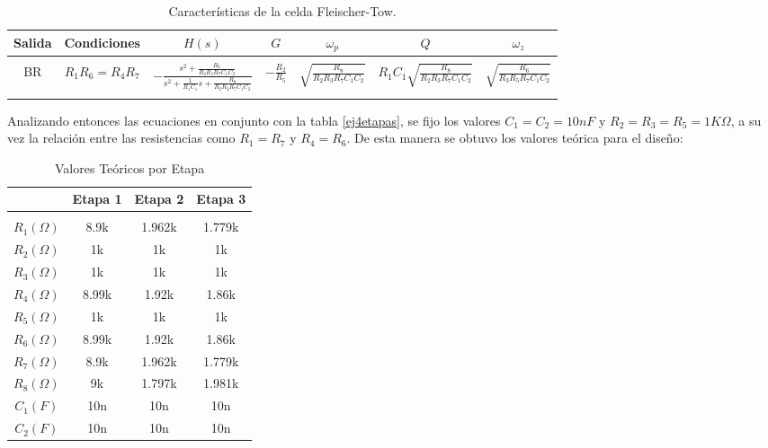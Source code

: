 \begin{table}[H] %
	\centering
	\begin{tabular}{c c c c c c c}
		Salida & Condiciones & $H(s)$ & $G$ & $\omega_p$ & $Q$ & $\omega_z$\\
		\hline \\
		BR &$R_1R_6=R_4R_7$ &\multirow{2}{*}{$- \frac{s^2+\frac{R_6}{R_3R_5R_7C_1C_2}}{s^2+\frac{1}{R_1C_1}s+\frac{R_8}{R_2R_3R_7C_1C_2}}$}&\multirow{2}{*}{$-\frac{R_2}{R_5}$}& \multirow{2}{*}{$\sqrt{\frac{R_8}{R_2R_3R_7C_1C_2}}$}&
		\multirow{2}{*}{$R_1C_1\sqrt{\frac{R_8}{R_2R_3R_7C_1C_2}}$}
		&\multirow{2}{*}{$\sqrt{\frac{R_6}{R_3 R_5 R_7 C_1 C_2}}$}\\ \\ \\
		\hline
	\end{tabular}
	\caption{Caracter\'isticas de la celda Fleischer-Tow.}
	\label{ej4hn}
\end{table}

Analizando entonces las ecuaciones en conjunto con la tabla \ref{ej4etapas}, se fijo los valores $C_1 = C_2 = 10nF$ y $R_2 = R_3 = R_5 = 1K\Omega$, a su vez la relación entre las resistencias como $R_1 = R_7$ y $R_4 = R_6$. De esta manera se obtuvo los valores teórica para el diseño:

\begin{table}[H]
	\centering
	\begin{tabular}{c c c c}
		&Etapa 1& Etapa 2 & Etapa 3 \\
		\hline \\
    		$R_1 (\Omega)$ & 8.9k & 1.962k& 1.779k \\
		$R_2 (\Omega)$ & 1k&1k &1k \\
		$R_3 (\Omega)$ & 1k & 1k& 1k \\
		$R_4 (\Omega)$ &8.99k  &1.92k & 1.86k\\
		$R_5 (\Omega)$ &1k & 1k&1k \\
		$R_6 (\Omega)$ &8.99k  &1.92k & 1.86k \\
		$R_7 (\Omega)$ & 8.9k & 1.962k& 1.779k \\
		$R_8 (\Omega)$ & 9k& 1.797k&1.981k \\
		$C_1 (F)$ & 10n&10n &10n \\
		$C_2 (F)$ & 10n&10n &10n \\
		\hline
	\end{tabular}
	\caption{Valores Teóricos por Etapa}
	\label{ej4valt}
\end{table}

